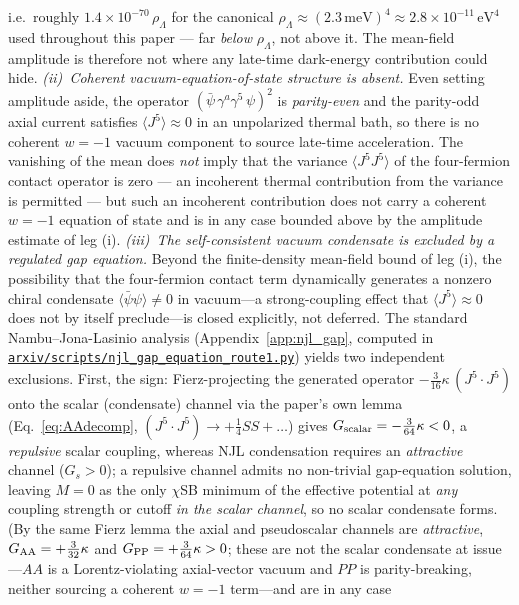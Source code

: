 \documentclass[aps,prd,twocolumn,superscriptaddress,showpacs,preprintnumbers,nofootinbib,longbibliography,floatfix]{revtex4-2}
\newcommand{\repoBase}{https://github.com/Hubify-Projects/bigbounce/blob/main}
\providecommand{\artifact}[1]{\href{\repoBase/#1}{\nolinkurl{#1}}}
\begin{document}
i.e.\ roughly $1.4\times 10^{-70}\,\rho_\Lambda$ for the canonical
$\rho_\Lambda\approx (2.3\,\text{meV})^4 \approx 2.8\times 10^{-11}\,\text{eV}^4$
used throughout this paper --- far \emph{below}
$\rho_\Lambda$, not above it. The mean-field amplitude is therefore
not where any late-time dark-energy contribution could hide.
\emph{(ii)~Coherent vacuum-equation-of-state structure is absent.}
Even setting amplitude aside, the operator $(\bar\psi\,\gamma^a\gamma^5\,\psi)^2$
is \emph{parity-even} and the parity-odd axial current satisfies
$\langle J^5\rangle\approx 0$ in an unpolarized thermal bath, so there is
no coherent $w=-1$ vacuum component to source late-time acceleration.
The vanishing of the mean does \emph{not} imply that the variance
$\langle J^5 J^5\rangle$ of the four-fermion contact operator is zero
--- an incoherent thermal contribution from the variance is permitted ---
but such an incoherent contribution does not carry a coherent
$w=-1$ equation of state and is in any case bounded above by the
amplitude estimate of leg (i). \emph{(iii)~The self-consistent vacuum
condensate is excluded by a regulated gap equation.} Beyond the finite-density
mean-field bound of leg (i), the possibility that the four-fermion contact
term dynamically generates a nonzero chiral condensate
$\langle\bar\psi\psi\rangle\neq0$ in vacuum---a strong-coupling effect that
$\langle J^5\rangle\approx0$ does not by itself preclude---is closed
explicitly, not deferred. The standard Nambu--Jona-Lasinio analysis
(Appendix~\ref{app:njl_gap}, computed in
\artifact{arxiv/scripts/njl\_gap\_equation\_route1.py}) yields two
independent exclusions. First, the sign: Fierz-projecting the generated
operator $-\tfrac{3}{16}\kappa\,(J^5\!\cdot\!J^5)$ onto the scalar
(condensate) channel via the paper's own lemma
(Eq.~\eqref{eq:AAdecomp}, $(J^5\!\cdot\!J^5)\to+\tfrac14 SS+\dots$) gives
$G_{\rm scalar}=-\tfrac{3}{64}\kappa<0$, a \emph{repulsive} scalar coupling,
whereas NJL condensation requires an \emph{attractive} channel ($G_s>0$); a
repulsive channel admits no non-trivial gap-equation solution, leaving $M=0$
as the only $\chi$SB minimum of the effective potential at \emph{any} coupling
strength or cutoff \emph{in the scalar channel}, so no scalar condensate forms.
(By the same Fierz lemma the axial and pseudoscalar channels are
\emph{attractive}, $G_{\rm AA}=+\tfrac{3}{32}\kappa$ and
$G_{\rm PP}=+\tfrac{3}{64}\kappa>0$; these are not the scalar condensate at
issue---$AA$ is a Lorentz-violating axial-vector vacuum and $PP$ is
parity-breaking, neither sourcing a coherent $w=-1$ term---and are in any case
\end{document}
